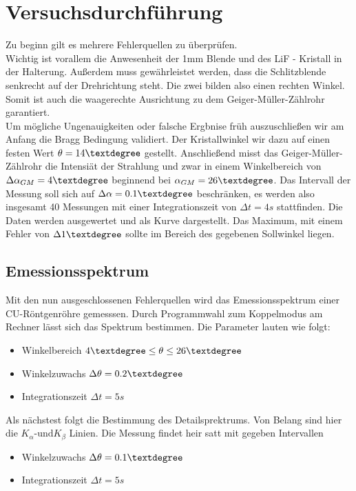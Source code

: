 \section{Versuchsdurchführung}
Zu beginn gilt es mehrere Fehlerquellen zu überprüfen. \\
Wichtig ist vorallem die Anwesenheit der 1mm Blende und des LiF - Kristall in der Halterung.
Außerdem muss gewährleistet werden, dass die Schlitzblende senkrecht auf der Drehrichtung steht. Die zwei bilden also einen rechten Winkel.
Somit ist auch die waagerechte Ausrichtung zu dem Geiger-Müller-Zählrohr garantiert. %
\\
\newline
Um mögliche Ungenauigkeiten oder falsche Ergbnise früh auszuschließen wir am Anfang die Bragg Bedingung %
validiert. Der Kristallwinkel wir dazu auf einen festen Wert $\theta = 14 \textdegree $  gestellt.
Anschließend misst das Geiger-Müller-Zählrohr die Intensiät der Strahlung und zwar in einem Winkelbereich von 
$\Delta \alpha_{GM} = 4 \textdegree$ beginnend bei $\alpha_{GM} = 26 \textdegree$. Das Intervall der Messung soll sich 
auf $\Delta \alpha = 0.1 \textdegree$ beschränken, es werden also insgesamt 40 Messungen mit einer Integrationszeit von $\Delta t = 4 \si{s}$ stattfinden. 
Die Daten werden ausgewertet und als Kurve dargestellt. Das Maximum, mit einem Fehler von $\Delta 1\textdegree$ sollte im Bereich des gegebenen Sollwinkel liegen.
\\
\newline
\subsection{Emessionsspektrum}
Mit den nun ausgeschlossenen Fehlerquellen wird das Emessionsspektrum einer CU-Röntgenröhre gemesssen.
Durch Programmwahl zum Koppelmodus am Rechner lässt sich das Spektrum bestimmen.
Die Parameter lauten wie folgt:
\begin{itemize}
    \item{Winkelbereich   $4 \textdegree \leq \theta \leq 26 \textdegree $}
    \item{Winkelzuwachs $\Delta \theta = 0.2 \textdegree$}
    \item{Integrationszeit $\Delta t = 5 \si{s}$}
\end{itemize}
Als nächstest folgt die Bestimmung des Detailsprektrums. Von Belang sind hier die $K_{\alpha} \text{-und} K_{\beta}$ Linien. 
Die Messung findet heir satt mit gegeben Intervallen
\begin{itemize}
    \item{Winkelzuwachs $\Delta \theta = 0.1 \textdegree$}
    \item{Integrationszeit $\Delta t = 5 \si{s}$}
\end{itemize}

